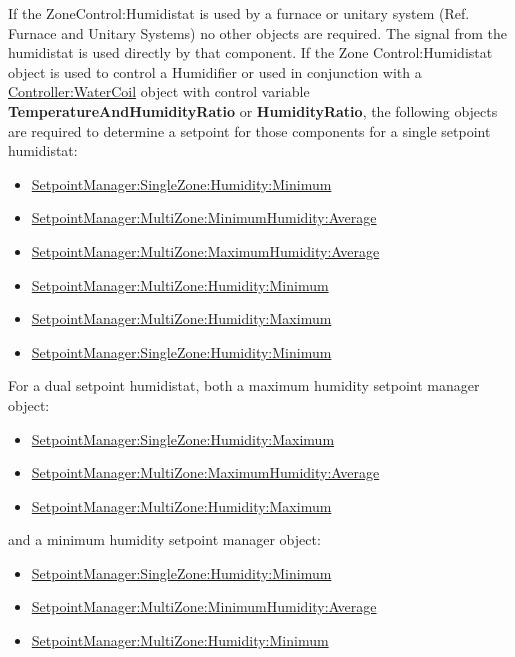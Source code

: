If the ZoneControl:Humidistat is used by a furnace or unitary system (Ref. Furnace and Unitary Systems) no other objects are required. The signal from the humidistat is used directly by that component. If the Zone Control:Humidistat object is used to control a Humidifier or used in conjunction with a \hyperref[controllerwatercoil]{Controller:WaterCoil} object with control variable \textbf{TemperatureAndHumidityRatio} or \textbf{HumidityRatio}, the following objects are required to determine a setpoint for those components for a single setpoint humidistat:

\begin{itemize}
\item
  \hyperref[setpointmanagersinglezonehumidityminimum]{SetpointManager:SingleZone:Humidity:Minimum}
\item
  \hyperref[setpointmanagermultizoneminimumhumidityaverage]{SetpointManager:MultiZone:MinimumHumidity:Average}
\item
  \hyperref[setpointmanagermultizonemaximumhumidityaverage]{SetpointManager:MultiZone:MaximumHumidity:Average}
\item
  \hyperref[setpointmanagermultizonehumidityminimum]{SetpointManager:MultiZone:Humidity:Minimum}
\item
  \hyperref[setpointmanagermultizonehumiditymaximum]{SetpointManager:MultiZone:Humidity:Maximum}
\item
  \hyperref[setpointmanagersinglezonehumidityminimum]{SetpointManager:SingleZone:Humidity:Minimum}
\end{itemize}

For a dual setpoint humidistat, both a maximum humidity setpoint manager object:

\begin{itemize}
\item
  \hyperref[setpointmanagersinglezonehumiditymaximum]{SetpointManager:SingleZone:Humidity:Maximum}
\item
  \hyperref[setpointmanagermultizonemaximumhumidityaverage]{SetpointManager:MultiZone:MaximumHumidity:Average}
\item
  \hyperref[setpointmanagermultizonehumiditymaximum]{SetpointManager:MultiZone:Humidity:Maximum}
\end{itemize}

and a minimum humidity setpoint manager object:

\begin{itemize}
\item
  \hyperref[setpointmanagersinglezonehumidityminimum]{SetpointManager:SingleZone:Humidity:Minimum}
\item
  \hyperref[setpointmanagermultizoneminimumhumidityaverage]{SetpointManager:MultiZone:MinimumHumidity:Average}
\item
  \hyperref[setpointmanagermultizonehumidityminimum]{SetpointManager:MultiZone:Humidity:Minimum}
\end{itemize}

